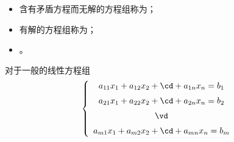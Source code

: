 \begin{itemize}
\item 含有矛盾方程而无解的方程组称为；
\item 有解的方程组称为；
\item {}。
\end{itemize}

对于一般的线性方程组
$$
\left\{
  \begin{array}{c}
    a_{11}x_1 + a_{12}x_2 + \cd + a_{1n}x_n = b_1\\[0.2cm]
    a_{21}x_1 + a_{22}x_2 + \cd + a_{2n}x_n = b_2\\[0.2cm]
    \vd\\[0.2cm]
    a_{m1}x_1 + a_{m2}x_2 + \cd + a_{mn}x_n = b_m
  \end{array}
\right.
$$

